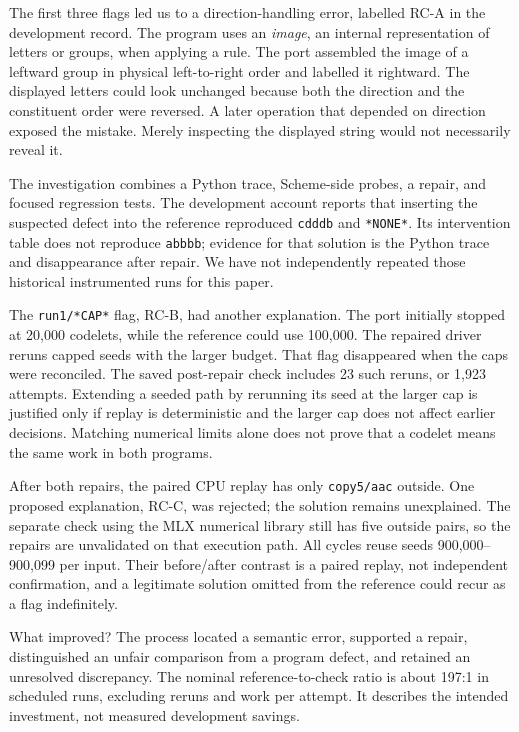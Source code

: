 \documentclass[10pt,letterpaper]{article}
\begin{document}
The first three flags led us to a direction-handling error, labelled RC-A in the
development record. The program uses an \emph{image}, an internal representation of
letters or groups, when applying a rule. The port assembled the image of a leftward group
in physical left-to-right order and labelled it rightward. The displayed letters could
look unchanged because both the direction and the constituent order were reversed. A later
operation that depended on direction exposed the mistake. Merely inspecting the displayed
string would not necessarily reveal it.

The investigation combines a Python trace, Scheme-side probes, a repair, and focused
regression tests. The development account reports that inserting the suspected defect into
the reference reproduced \texttt{cdddb} and \texttt{*NONE*}. Its intervention table does
not reproduce \texttt{abbbb}; evidence for that solution is the Python trace and
disappearance after repair. We have not independently repeated those historical
instrumented runs for this paper.

The \texttt{run1/*CAP*} flag, RC-B, had another explanation. The port initially stopped at
20,000 codelets, while the reference could use 100,000. The repaired driver reruns capped
seeds with the larger budget. That flag disappeared when the caps were reconciled. The
saved post-repair check includes 23 such reruns, or 1,923 attempts. Extending a seeded
path by rerunning its seed at the larger cap is justified only if replay is deterministic
and the larger cap does not affect earlier decisions. Matching numerical limits alone does
not prove that a codelet means the same work in both programs.

After both repairs, the paired CPU replay has only \texttt{copy5/aac} outside. One
proposed explanation, RC-C, was rejected; the solution remains unexplained. The separate
check using the MLX numerical library still has five outside pairs, so the repairs are
unvalidated on that execution path. All cycles reuse seeds 900,000--900,099 per input.
Their before/after contrast is a paired replay, not independent confirmation, and a
legitimate solution omitted from the reference could recur as a flag indefinitely.

What improved? The process located a semantic error, supported a repair, distinguished an
unfair comparison from a program defect, and retained an unresolved discrepancy. The
nominal reference-to-check ratio is about 197:1 in scheduled runs, excluding reruns and
work per attempt. It describes the intended investment, not measured development savings.
\end{document}
